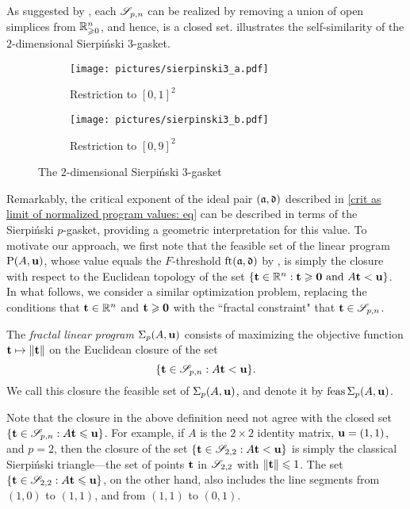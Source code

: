 \documentclass{amsart}
\begin{document}
As suggested by , each $\mathscr{S}_{p,n}$  can be realized by removing a union of open simplices from $\mathbb{R}_{\geqslant 0}^n$, and hence, is a closed set.
 illustrates the self-similarity of the $2$-dimensional Sierpi\'nski $3$-gasket.

\begin{figure}
\begin{subfigure}{.49\textwidth}
  \centering
  \texttt{[image: pictures/sierpinski3\_a.pdf]}
  \caption{Restriction to $[0,1]^2$}
\end{subfigure}
\begin{subfigure}{.49\textwidth}
  \centering
  \texttt{[image: pictures/sierpinski3\_b.pdf]}
  \caption{Restriction to $[0,9]^2$}
\end{subfigure}
\caption{The $2$-dimensional Sierpi\'nski 3-gasket}
\label{fig: sierpinski 3-gasket}
\end{figure}

Remarkably, the critical exponent of the ideal pair $(\mathfrak{a}, \mathfrak{d})$ described in \eqref{crit as limit of normalized program values: eq} can be described in terms of the Sierpi\'nski $p$-gasket, providing a geometric interpretation for this value.
To motivate our approach, we first note that the feasible set of the linear program $\mathrm{P}(A, \mathbf{u})$, whose value equals the $F$-threshold $\operatorname{ft}(\mathfrak{a}, \mathfrak{d})$ by , is simply the closure with respect to the Euclidean topology of the set $\{ \mathbf{t} \in \mathbb{R}^n : \mathbf{t} \geqslant \mathbf{0} \text{ and } A\mathbf{t} < \mathbf{u} \}$.
In what follows, we consider a similar optimization problem,  replacing the conditions that $\mathbf{t} \in \mathbb{R}^n$ and $\mathbf{t} \geqslant \mathbf{0}$ with the ``fractal constraint" that $\mathbf{t} \in \mathscr{S}_{p,n}$.

\begin{definition}
\label{fractal program: D}
The \emph{fractal linear program} $\Sigma_p(A,\mathbf{u})$ consists of maximizing the objective function $\mathbf{t}\mapsto \| \mathbf{t} \|$ on the Euclidean closure of the set \[ \{ \mathbf{t} \in \mathscr{S}_{p,n} : A \mathbf{t} < \mathbf{u} \}.\]  We call this closure the feasible set of $\Sigma_p(A, \mathbf{u})$, and denote it by $\operatorname{feas} \Sigma_p(A, \mathbf{u})$.
\end{definition}

\begin{remark}
Note that the closure in the above definition need not agree with the closed set $\{ \mathbf{t} \in \mathscr{S}_{p,n} : A \mathbf{t} \leqslant \mathbf{u} \}$.
For example, if $A$ is the $2\times 2$ identity matrix, $\mathbf{u} = (1,1)$, and $p=2$, then the closure of the set $\{ \mathbf{t} \in \mathscr{S}_{2,2} : A \mathbf{t} < \mathbf{u} \}$ is simply the classical Sierpi\'nski triangle---the set of points $\mathbf{t}$ in $\mathscr{S}_{2,2}$ with $\| \mathbf{t} \| \leqslant 1$.
The set $\{ \mathbf{t} \in \mathscr{S}_{2,2} : A \mathbf{t} \leqslant \mathbf{u} \}$, on the other hand, also includes the line segments from $(1,0)$ to $(1,1)$, and from $(1,1)$ to $(0,1)$.
\end{remark}
\end{document}

